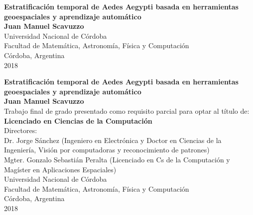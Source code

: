 \begin{center}
\begin{figure}
\centering%
%
\end{figure}
\thispagestyle{empty} \vspace*{0.1cm} \textbf{\huge
Estratificación temporal de Aedes Aegypti basada en herramientas geoespaciales y aprendizaje automático}\\[8.5cm]
\Large\textbf{Juan Manuel Scavuzzo}\\[0.5cm]
\small Universidad Nacional de Córdoba\\
Facultad de Matemática, Astronomía, Física y Computación\\
Córdoba, Argentina\\
2018\\
\end{center}

\newpage{\pagestyle{empty}\cleardoublepage}

\newpage
\begin{center}
\thispagestyle{empty} \vspace*{0cm} \textbf{\huge
Estratificación temporal de Aedes Aegypti basada en herramientas geoespaciales y aprendizaje automático}\\[6.0cm]
\Large\textbf{Juan Manuel Scavuzzo}\\[2.0cm]
\small Trabajo final de grado presentado como requisito parcial para optar al
título de:\\
\textbf{Licenciado en Ciencias de la Computación}\\[2.0cm]
Directores:\\

Dr. Jorge Sánchez (Ingeniero en Electrónica y Doctor en Ciencias de la Ingeniería, Visión por computadoras y reconocimiento de patrones)\\
Mgter. Gonzalo Sebastián Peralta (Licenciado en Cs de la Computación y Magíster en Aplicaciones Espaciales)\\ [2.0cm]

Universidad Nacional de Córdoba\\
Facultad de Matemática, Astronomía, Física y Computación\\
Córdoba, Argentina\\
2018\\\end{center}


\newpage{\pagestyle{empty}\cleardoublepage}

